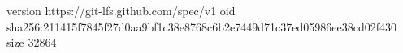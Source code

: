 version https://git-lfs.github.com/spec/v1
oid sha256:211415f7845f27d0aa9bf1c38e8768c6b2e7449d71c37ed05986ee38cd02f430
size 32864
